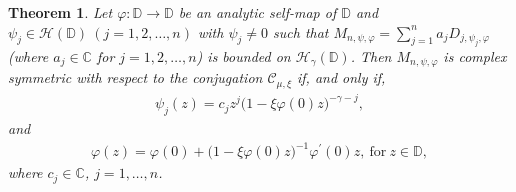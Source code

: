 \documentclass[12pt, reqno]{amsart}
\newtheorem{theorem}{Theorem}[section]
\theoremstyle{definition}
\theoremstyle{remark}
\numberwithin{equation}{section}
\begin{document}
\begin{theorem}\label{Thm_3}
	  Let $\varphi: \mathbb{D}\longrightarrow \mathbb{D}$ be an analytic self-map of $\mathbb{D}$ and $\psi_j\in \mathcal{H}(\mathbb{D})~(j=1, 2,\dots, n)$ with $\psi_j \neq 0$ such that $M_{n, \psi, \varphi}=\displaystyle\sum_{j=1}^{n}a_jD_{j,\psi_j, \varphi} $ (where $a_j\in \mathbb{C}$ for $j=1, 2, \dots, n$) is bounded on $\mathcal{H}_\gamma(\mathbb{D})$. Then $M_{n,\psi,\varphi}$ is complex symmetric with respect to the conjugation $\mathcal{C}_{\mu, \xi}$ if, and only if,
	\begin{gather*}
	\psi_j(z)=c_jz^{j}\big(1-\xi \varphi(0) z\big)^{-\gamma-j},
	\end{gather*}
	and 
	\begin{gather*}
	\varphi(z)=\varphi(0)+\big(1-\xi \varphi(0) z\big)^{-1}\varphi^{\prime}(0)z,~ \mbox{for}~ z\in \mathbb{D},
	\end{gather*}
	where $c_j\in \mathbb{C}$, $j=1, \dots, n$.
\end{theorem}
\end{document}
